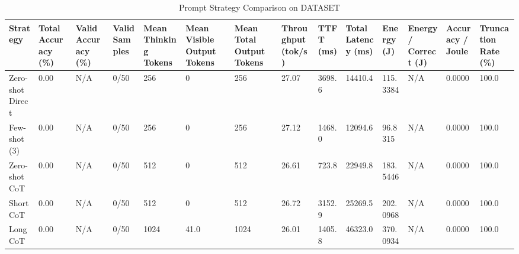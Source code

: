 \begin{table}
\caption{Prompt Strategy Comparison on DATASET}
\label{tab:strategy_comparison}
\begin{tabular}{llllllllllllll}
\toprule
Strategy & Total Accuracy (\%) & Valid Accuracy (\%) & Valid Samples & Mean Thinking Tokens & Mean Visible Output Tokens & Mean Total Output Tokens & Throughput (tok/s) & TTFT (ms) & Total Latency (ms) & Energy (J) & Energy / Correct (J) & Accuracy / Joule & Truncation Rate (\%) \\
\midrule
Zero-shot Direct & 0.00 & N/A & 0/50 & 256 & 0 & 256 & 27.07 & 3698.6 & 14410.4 & 115.3384 & N/A & 0.0000 & 100.0 \\
Few-shot (3) & 0.00 & N/A & 0/50 & 256 & 0 & 256 & 27.12 & 1468.0 & 12094.6 & 96.8315 & N/A & 0.0000 & 100.0 \\
Zero-shot CoT & 0.00 & N/A & 0/50 & 512 & 0 & 512 & 26.61 & 723.8 & 22949.8 & 183.5446 & N/A & 0.0000 & 100.0 \\
Short CoT & 0.00 & N/A & 0/50 & 512 & 0 & 512 & 26.72 & 3152.9 & 25269.5 & 202.0968 & N/A & 0.0000 & 100.0 \\
Long CoT & 0.00 & N/A & 0/50 & 1024 & 41.0 & 1024 & 26.01 & 1405.8 & 46323.0 & 370.0934 & N/A & 0.0000 & 100.0 \\
\bottomrule
\end{tabular}
\end{table}
